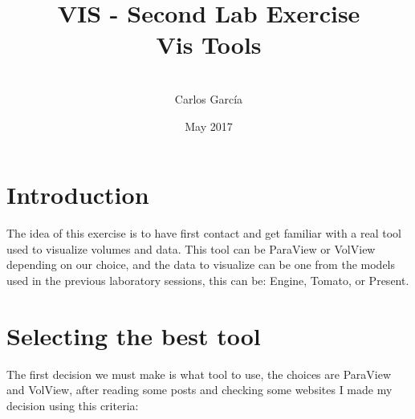 \documentclass{article}
\title{VIS - Second Lab Exercise \\ \bigskip Vis Tools}
\author{\\ Carlos García}
\date{May 2017}
\begin{document}
\maketitle \newpage \tableofcontents \newpage
\section{Introduction}
  The idea of this exercise is to have first contact and get familiar with a real tool used to visualize volumes and data.
  This tool can be ParaView or VolView depending on our choice, and the data to visualize can be one from the models used in the previous laboratory sessions, this can be: Engine, Tomato, or Present.

\section{Selecting the best tool}
  The first decision we must make is what tool to use, the choices are ParaView and VolView, after reading some posts and checking some websites I made my decision using this criteria:
\end{document}
